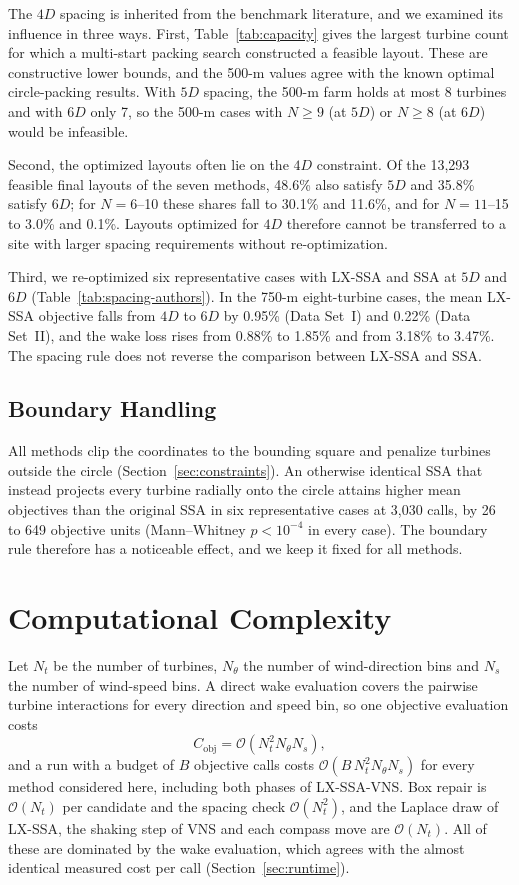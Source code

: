 \documentclass[journal,twoside]{IEEEtran}
\begin{document}
The $4D$ spacing is inherited from the benchmark literature, and we examined its influence in three ways. First, Table~\ref{tab:capacity} gives the largest turbine count for which a multi-start packing search constructed a feasible layout. These are constructive lower bounds, and the 500-m values agree with the known optimal circle-packing results. With $5D$ spacing, the 500-m farm holds at most 8 turbines and with $6D$ only 7, so the 500-m cases with $N\ge9$ (at $5D$) or $N\ge8$ (at $6D$) would be infeasible.

Second, the optimized layouts often lie on the $4D$ constraint. Of the 13,293 feasible final layouts of the seven methods, 48.6\% also satisfy $5D$ and 35.8\% satisfy $6D$; for $N=6$--10 these shares fall to 30.1\% and 11.6\%, and for $N=11$--15 to 3.0\% and 0.1\%. Layouts optimized for $4D$ therefore cannot be transferred to a site with larger spacing requirements without re-optimization.

Third, we re-optimized six representative cases with LX-SSA and SSA at $5D$ and $6D$ (Table~\ref{tab:spacing-authors}). In the 750-m eight-turbine cases, the mean LX-SSA objective falls from $4D$ to $6D$ by 0.95\% (Data Set~I) and 0.22\% (Data Set~II), and the wake loss rises from 0.88\% to 1.85\% and from 3.18\% to 3.47\%. The spacing rule does not reverse the comparison between LX-SSA and SSA.

\subsection{Boundary Handling}
\label{sec:boundary}
All methods clip the coordinates to the bounding square and penalize turbines outside the circle (Section~\ref{sec:constraints}). An otherwise identical SSA that instead projects every turbine radially onto the circle attains higher mean objectives than the original SSA in six representative cases at 3,030 calls, by 26 to 649 objective units (Mann--Whitney $p<10^{-4}$ in every case). The boundary rule therefore has a noticeable effect, and we keep it fixed for all methods.

\section{Computational Complexity}
\label{sec:complexity}
Let $N_t$ be the number of turbines, $N_\theta$ the number of wind-direction bins and $N_s$ the number of wind-speed bins. A direct wake evaluation covers the pairwise turbine interactions for every direction and speed bin, so one objective evaluation costs
\[
C_{\mathrm{obj}}=\mathcal{O}\!\left(N_t^2N_\theta N_s\right),
\]
and a run with a budget of $B$ objective calls costs $\mathcal{O}(B\,N_t^2N_\theta N_s)$ for every method considered here, including both phases of LX-SSA-VNS. Box repair is $\mathcal{O}(N_t)$ per candidate and the spacing check $\mathcal{O}(N_t^2)$, and the Laplace draw of LX-SSA, the shaking step of VNS and each compass move are $\mathcal{O}(N_t)$. All of these are dominated by the wake evaluation, which agrees with the almost identical measured cost per call (Section~\ref{sec:runtime}).
\end{document}
